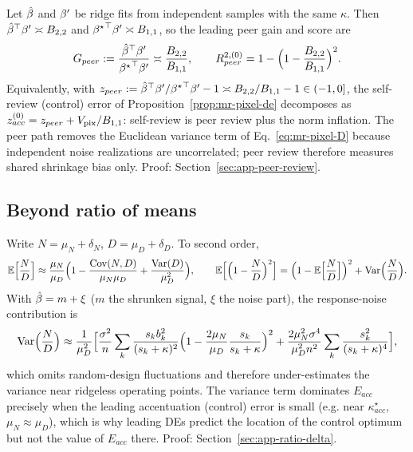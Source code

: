 \begin{prop}
\label{prop:mr-peer}
Let $\hat{\beta}$ and ${\beta^{\prime}}$ be ridge fits from independent samples with the
same $\kappa$.  Then ${\hat{\beta}}^\top{\beta^{\prime}}\asymp B_{2,2}$ and
${{\beta^{\star}}}^\top{\beta^{\prime}}\asymp B_{1,1}$, so the leading peer gain and score are
\begin{equation}
G_{peer}:=\frac{{\hat{\beta}}^\top{\beta^{\prime}}}{{{\beta^{\star}}}^\top{\beta^{\prime}}}\asymp\frac{B_{2,2}}{B_{1,1}},
\qquad
R^{2,(0)}_{peer}=1-\Big(1-\frac{B_{2,2}}{B_{1,1}}\Big)^2 .
\label{eq:mr-peer}
\end{equation}
Equivalently, with $z_{peer}:={\hat{\beta}}^\top{\beta^{\prime}}/{{\beta^{\star}}}^\top{\beta^{\prime}}-1\asymp B_{2,2}/B_{1,1}-1\in(-1,0]$, the self-review (control) error of Proposition~\ref{prop:mr-pixel-de} decomposes as $z^{(0)}_{acc}=z_{peer}+V_{\rm pix}/B_{1,1}$: self-review is peer review plus the norm inflation.
The peer path removes the Euclidean variance term of
Eq.~\ref{eq:mr-pixel-D} because independent noise realizations are
uncorrelated; peer review therefore measures shared shrinkage bias only.
Proof: Section~\ref{sec:app-peer-review}.
\end{prop}

\subsection{Beyond ratio of means}

\begin{prop}
\label{prop:mr-ratio-delta}
Write $N=\mu_N+\delta_N$, $D=\mu_D+\delta_D$.  To second order,
\begin{equation}
\mathbb{E}\Big[\frac ND\Big]\approx\frac{\mu_N}{\mu_D}
\Big(1-\frac{\mathrm{Cov}(N,D)}{\mu_N\mu_D}+\frac{\mathrm{Var}(D)}{\mu_D^2}\Big),\qquad
\mathbb{E}\Big[\Big(1-\frac ND\Big)^2\Big]
=\Big(1-\mathbb{E}\Big[\frac ND\Big]\Big)^2+\mathrm{Var}\Big(\frac ND\Big).
\end{equation}
With $\hat{\beta}=m+\xi$ ($m$ the shrunken signal, $\xi$ the noise part), the
response-noise contribution is
\begin{equation}
\mathrm{Var}\Big(\frac ND\Big)\approx\frac{1}{\mu_D^2}
\Big[\frac{\sigma^2}{n}\sum_k\frac{s_kb_k^2}{(s_k+\kappa)^2}
\Big(1-\frac{2\mu_N}{\mu_D}\frac{s_k}{s_k+\kappa}\Big)^2
+\frac{2\mu_N^2\sigma^4}{\mu_D^2n^2}\sum_k\frac{s_k^2}{(s_k+\kappa)^4}\Big],
\end{equation}
which omits random-design fluctuations and therefore under-estimates the
variance near ridgeless operating points.  The variance term dominates
$E_{acc}$ precisely when the leading accentuation (control) error is small
(e.g. near $\kappa^\star_{acc}$, $\mu_N\approx \mu_D$), which is why leading DEs predict the
location of the control optimum but not the value of $E_{acc}$ there.
Proof: Section~\ref{sec:app-ratio-delta}.
\end{prop}

